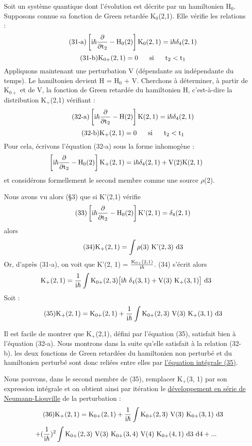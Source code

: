 Soit un système quantique dont l'évolution est décrite par un
hamiltonien H$_0$. Supposons connue sa fonction de Green retardée K$_0$(2,1).
Elle vérifie les relations :
\[
\tag{31-a}\left[\text{i}\hbar\frac{\partial}{\partial \text{t}_2}-\text{H}_0(2)\right]\text{K}_0(2,1)=\text{i}\hbar\delta_4(2,1)
\]
\[
\tag{31-b}\mt{K}_{0+}(2,1)=0\ \ \ \ \ \mt{si} \ \ \ \ \ \mt{t}_2<\mt{t}_1
\]
Appliquons maintenant une perturbation V (dépendante au indépendante du
temps). Le hamiltonien devient H = H$_0$ + V. Cherchons à déterminer, à partir
de K$_{0+}$ et de V, la fonction de Green retardée du hamiltonien H, c'est-à-dire
la distribution K$_+$(2,1) vérifiant :
\[
\tag{32-a}\left[\text{i}\hbar\frac{\partial}{\partial \text{t}_2}-\text{H}(2)\right]\text{K}(2,1)=\text{i}\hbar\delta_4(2,1)
\]
\[
\tag{32-b}\text{K}_+(2,1)=0\ \ \ \ \ \text{si} \ \ \ \ \ \text{t}_2<\text{t}_1
\]
Pour cela, écrivons l'équation (32-a) sous la forme inhomogène :
\[
\left[\text{i}\hbar\frac{\partial}{\partial \text{t}_2}-\text{H}_0(2)\right]\text{K}_+(2,1)=\text{i}\hbar\delta_4(2,1)+\text{V}(2)\text{K}(2,1)
\]
et considérons formellement le second membre comme une source $\rho$(2).


Nous avons vu alors (\S 3) que si K'(2,1) vérifie
\[
\tag{33}\left[\text{i}\hbar\frac{\partial}{\partial \text{t}_2}-\text{H}_0(2)\right]\text{K'}(2,1)=\delta_4(2,1)
\]
alors
\[
\tag{34}\text{K}_+(2,1)=\int\rho(3)\text{ K'}(2,3)\text{ d}3
\]
Or, d'après (31-a), on voit que K'(2, 1) = $\frac{\text{K}_{0+}(2,1)}{\text{i}\hbar}$.
(34) s'écrit alors
\[
\mt{K}_+(2,1)=\frac{1}{\mt{i}\hbar}\int\mt{K}_{0+}(2,3)\big[\mt{i}\hbar\ \delta_4(3,1)+\mt{V}(3)\mt{ K}_+(3,1)\big]\mt{ d}3
\]
Soit :
\[
\tag{35}\text{K}_+(2,1)=\text{K}_{0+}(2,1)+\frac{1}{\text{i}\hbar}\int\text{K}_{0+}(2,3)\text{ V}(3)\text{ K}_+(3,1)\text{ d}3
\]

Il est facile de montrer que K$_+$(2,1), défini par l'équation (35),
satisfait bien à l'équation (32-a). Nous montrons dans la suite qu'elle
satisfait à la relation (32-b). les deux fonctions de Green retardées
du hamiltonien non perturbé et du hamiltonien perturbé sont donc reliées
entre elles par \ul{l'équation intégrale (35)}.

Nous pouvons, dans le second membre de (35), remplacer K$_+$(3, 1)
par son expression intégrale et on obtient ainsi par itération le \ul{développement
en série de Neumann-Liouville} de la perturbation :
\[
\tag{36}\text{K}_+(2,1)=\text{K}_{0+}(2,1)+\frac{1}{\text{i}\hbar}\int\text{K}_{0+}(2,3)\text{ V}(3)\text{ K}_{0+}(3,1)\text{ d}3
\]
\[
+(\frac{1}{\text{i}\hbar})^2\int\text{K}_{0+}(2,3)\text{ V}(3)\text{ K}_{0+}(3,4)\text{ V}(4)\text{ K}_{0+}(4,1)\text{ d}3\text{ d}4 + ...
\]

